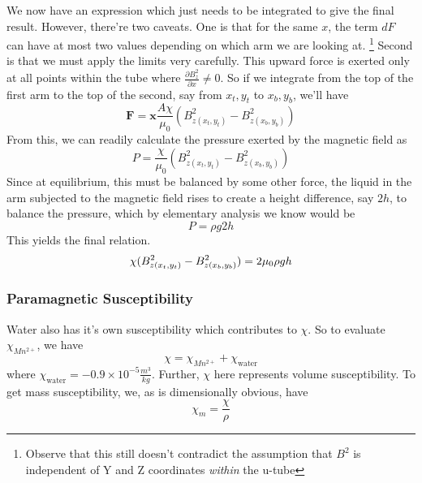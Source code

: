 			We now have an expression which just needs to be integrated to give the final result. However, there're two caveats. One is that for the same $x$, the term $dF$ can have at most two values depending on which arm we are looking at. \footnote{Observe that this still doesn't contradict the assumption that $B^2$ is independent of Y and Z coordinates \emph{within} the u-tube} Second is that we must apply the limits very carefully. This upward force is exerted only at all points within the tube where $\displaystyle \frac{\partial B_z^2}{\partial x} \neq 0$. So if we integrate from the top of the first arm to the top of the second, say from $x_t,y_t$ to $x_b,y_b$, we'll have
			\begin{equation}
				\pmb F = \pmb x \frac {A \chi} {\mu_0} (B^2_{z(x_t,y_t)} - B^2_{z(x_b,y_b)})
			\end{equation}
			From this, we can readily calculate the pressure exerted by the magnetic field as
			\begin{equation}
				P = \frac {\chi} {\mu_0} (B^2_{z(x_t,y_t)} - B^2_{z(x_b,y_b)})
			\end{equation}
			Since at equilibrium, this must be balanced by some other force, the liquid in the arm subjected to the magnetic field rises to create a height difference, say $2h$, to balance the pressure, which by elementary analysis we know would be
			\begin{equation}
				P = \rho g 2h
			\end{equation}
			This yields the final relation.
			\begin{equation} {\label{eqn_final}}
				\chi (B^2_{z(x_t,y_t)} - B^2_{z(x_b,y_b)}) = 2 \mu_0 \rho g h
			\end{equation}
		\subsubsection{Paramagnetic Susceptibility}
			Water also has it's own susceptibility which contributes to $\chi$. So to evaluate $\chi_{Mn^{2+}}$, we have
			\begin{equation}
				\chi = \chi_{Mn^{2+}} + \chi_{\text{water}} 
			\end{equation}
			where $\chi_{\text{water}} = -0.9 \times 10^{-5} \frac{m^3}{kg}$. Further, $\chi$ here represents volume susceptibility. To get mass susceptibility, we, as is dimensionally obvious, have
			\begin{equation}
				\chi_m=\frac \chi \rho
			\end{equation}
